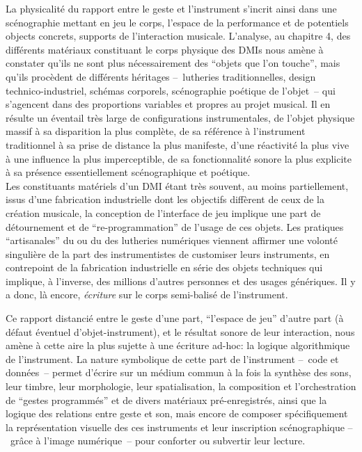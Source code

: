 \noindent La physicalité du rapport entre le geste et l'instrument s'incrit ainsi dans une scénographie mettant en jeu le corps, l'espace de la performance et de potentiels objects concrets, supports de l'interaction musicale. L'analyse, au chapitre 4, des différents matériaux constituant le corps physique des \glspl{DMI} nous amène à constater qu'ils ne sont plus nécessairement des ``objets que l'on touche'', mais qu'ils procèdent de différents héritages --~lutheries traditionnelles, design technico-industriel, schémas corporels, scénographie poétique de l'objet~-- qui s'agencent dans des proportions variables et propres au projet musical. Il en résulte un éventail très large de configurations instrumentales, de l'objet physique massif à sa disparition la plus complète, de sa référence à l'instrument traditionnel à sa prise de distance la plus manifeste, d'une réactivité la plus vive à une influence la plus imperceptible, de sa fonctionnalité sonore la plus explicite à sa présence essentiellement scénographique et poétique.\\

\indent Les constituants matériels d'un \gls{DMI} étant très souvent, au moins partiellement, issus d'une fabrication industrielle dont les objectifs diffèrent de ceux de la création musicale, la conception de l'interface de jeu implique une part de détournement et de ``re-programmation'' de l'usage de ces objets. Les pratiques ``artisanales'' du  ou du  des lutheries numériques viennent affirmer une volonté singulière de la part des instrumentistes de customiser leurs instruments, en contrepoint de la fabrication industrielle en série des objets techniques qui implique, à l'inverse, des millions d'autres personnes et des usages génériques. Il y a donc, là encore, \textit{écriture} sur le corps semi-balisé de l'instrument.


\indent Ce rapport distancié entre le geste d'une part, ``l'espace de jeu'' d'autre part (à défaut éventuel d'objet-instrument), et le résultat sonore de leur interaction, nous amène à cette aire la plus sujette à une écriture ad-hoc: la logique algorithmique de l'instrument. La nature symbolique de cette part de l'instrument --~code et données~-- permet d'écrire sur un médium commun à la fois la synthèse des sons, leur timbre, leur morphologie, leur spatialisation, la composition et l'orchestration de ``gestes programmés'' et de divers matériaux pré-enregistrés, ainsi que la logique des relations entre geste et son, mais encore de composer spécifiquement la représentation visuelle des ces instruments et leur inscription scénographique --~grâce à l'image numérique~-- pour conforter ou subvertir leur lecture.

